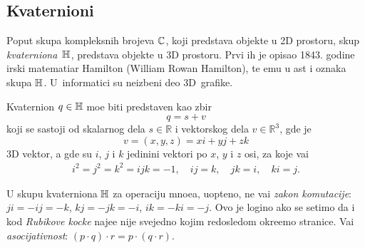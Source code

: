 \subsection{Kvaternioni}

\def\uv{{u}}
\def\vp{{\vec v}}
\def\norm#1{{\vert#1\vert}}
\def\con#1{{\bar#1}}

Poput skupa kompleksnih brojeva ${\mathbb C}$, koji predstav{\lj}a objekte u 2D prostoru,
skup {\sl kvater\-niona\/}~${\mathbb H}$, predstav{\lj}a objekte u 3D prostoru. Prvi ih je opisao 
1843. godine irski ma\-te\-ma\-ti\-{\cv}ar
Hamilton (William Rowan Hamilton), te {\nj}emu u {\cv}ast i oznaka skupa ${\mathbb H}$.
U~informatici su neizbe{\zv}ni deo 3D~grafike.

\medskip

Kvaternion $q\in{\mathbb H}$ mo{\zv}e biti predstav{\lj}en kao zbir
\begin{equation}
    q=s+v
\end{equation}
koji se sastoji od skalarnog dela $s\in{\mathbb R}$ i vektorskog dela $v\in{\mathbb R}^3$, gde je
\begin{equation}
    v=(x,y,z)=xi+yj+zk
\end{equation}
3D vektor, 
a gde su $i$, $j$ i $k$ jedini{\cv}ni vektori po $x$, $y$ i $z$ osi,
za koje va{\zv}i
\begin{gather}\label{eq:qunits}
    i^2=j^2=k^2=ijk=-1,\quad
    ij=k,\quad jk=i,\quad ki=j. 
\end{gather}

\danger U skupu kvaterniona ${\mathbb H}$ za operaciju mno{\zv}e{\nj}a, uop{\sv}teno, ne va{\zv}i {\sl zakon komutacije}:
$ji=-ij=-k$, $kj=-jk=-i$, $ik=-ki=-j$.
Ovo je logi{\cv}no ako se setimo da i kod
{\sl Rubikove kocke\/} naj{\cv}e{\sv}{\cc}e nije svejedno kojim redosledom okre{\cc}emo stranice.
Va{\zv}i {\sl asocijativnost}: $(p\cdot q)\cdot r=p\cdot(q\cdot r)$.

\medskip

